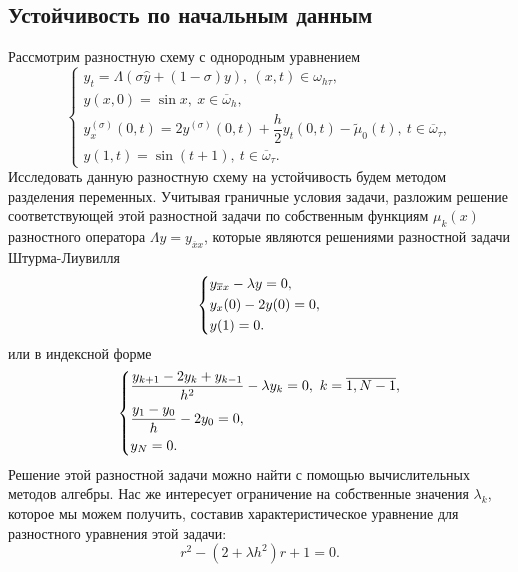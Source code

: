 \documentclass[a4paper, 12pt]{article}
\begin{document}
    	\subsection*{Устойчивость по начальным данным}
    	Рассмотрим разностную схему с однородным уравнением
    	\begin{equation}
    		\begin{cases}
    			y_t = \Lambda(\sigma \hat y + (1-\sigma)y),\ (x,t)\in \omega_{h\tau},\\
    			y(x,0) = \sin x,\ x \in \overline \omega_h,\\
    			y_x^{(\sigma)}(0,t) = 2y^{(\sigma)}(0,t) + \dfrac h2 y_t(0,t) - \tilde \mu_0(t),\ t \in \overline \omega_\tau,\\ 
    			y(1,t) = \sin(t+1),\ t \in \overline \omega_\tau.
    		\end{cases}
    	\end{equation}
    	Исследовать данную разностную схему на устойчивость будем методом разделения переменных. Учитывая граничные условия задачи, разложим решение соответствующей этой разностной задачи по собственным функциям $\mu_k(x)$ разностного оператора $\Lambda y = y_{\overline x x}$, которые являются решениями разностной задачи Штурма-Лиувилля
    	\begin{equation*}\begin{dcases}
    			y_{\overline x x} - \lambda y = 0,\\
    			y_x(0)- 2y(0) = 0,\\
    			y(1) = 0.
    		\end{dcases}
    	\end{equation*}
    	или в индексной форме
    	\begin{equation*}
    		\begin{dcases}
    			\dfrac{y_{k+1} - 2y_k + y_{k-1}}{h^2} - \lambda y_k= 0,\ k = \overline{1, N-1},\\
    			\dfrac{y_1 - y_0}{h} - 2y_0 = 0,\\
    			y_N = 0.
    		\end{dcases}
    	\end{equation*}
    	Решение этой разностной задачи можно найти с помощью вычислительных методов алгебры. Нас же интересует ограничение на собственные значения $\lambda_k$, которое мы можем получить, составив характеристическое уравнение для разностного уравнения этой задачи:
    	\begin{equation*}
    		r^2 - (2+\lambda h^2) r + 1 = 0.
    	\end{equation*}
\end{document}
